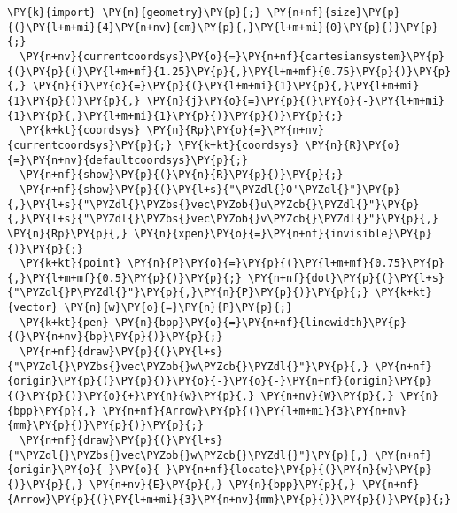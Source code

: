 \begin{Verbatim}[commandchars=\\\{\}]
  \PY{k}{import} \PY{n}{geometry}\PY{p}{;} \PY{n+nf}{size}\PY{p}{(}\PY{l+m+mi}{4}\PY{n+nv}{cm}\PY{p}{,}\PY{l+m+mi}{0}\PY{p}{)}\PY{p}{;}
  \PY{n+nv}{currentcoordsys}\PY{o}{=}\PY{n+nf}{cartesiansystem}\PY{p}{(}\PY{p}{(}\PY{l+m+mf}{1.25}\PY{p}{,}\PY{l+m+mf}{0.75}\PY{p}{)}\PY{p}{,} \PY{n}{i}\PY{o}{=}\PY{p}{(}\PY{l+m+mi}{1}\PY{p}{,}\PY{l+m+mi}{1}\PY{p}{)}\PY{p}{,} \PY{n}{j}\PY{o}{=}\PY{p}{(}\PY{o}{-}\PY{l+m+mi}{1}\PY{p}{,}\PY{l+m+mi}{1}\PY{p}{)}\PY{p}{)}\PY{p}{;}
  \PY{k+kt}{coordsys} \PY{n}{Rp}\PY{o}{=}\PY{n+nv}{currentcoordsys}\PY{p}{;} \PY{k+kt}{coordsys} \PY{n}{R}\PY{o}{=}\PY{n+nv}{defaultcoordsys}\PY{p}{;}
  \PY{n+nf}{show}\PY{p}{(}\PY{n}{R}\PY{p}{)}\PY{p}{;}
  \PY{n+nf}{show}\PY{p}{(}\PY{l+s}{"\PYZdl{}O'\PYZdl{}"}\PY{p}{,}\PY{l+s}{"\PYZdl{}\PYZbs{}vec\PYZob{}u\PYZcb{}\PYZdl{}"}\PY{p}{,}\PY{l+s}{"\PYZdl{}\PYZbs{}vec\PYZob{}v\PYZcb{}\PYZdl{}"}\PY{p}{,} \PY{n}{Rp}\PY{p}{,} \PY{n}{xpen}\PY{o}{=}\PY{n+nf}{invisible}\PY{p}{)}\PY{p}{;}
  \PY{k+kt}{point} \PY{n}{P}\PY{o}{=}\PY{p}{(}\PY{l+m+mf}{0.75}\PY{p}{,}\PY{l+m+mf}{0.5}\PY{p}{)}\PY{p}{;} \PY{n+nf}{dot}\PY{p}{(}\PY{l+s}{"\PYZdl{}P\PYZdl{}"}\PY{p}{,}\PY{n}{P}\PY{p}{)}\PY{p}{;} \PY{k+kt}{vector} \PY{n}{w}\PY{o}{=}\PY{n}{P}\PY{p}{;}
  \PY{k+kt}{pen} \PY{n}{bpp}\PY{o}{=}\PY{n+nf}{linewidth}\PY{p}{(}\PY{n+nv}{bp}\PY{p}{)}\PY{p}{;}
  \PY{n+nf}{draw}\PY{p}{(}\PY{l+s}{"\PYZdl{}\PYZbs{}vec\PYZob{}w\PYZcb{}\PYZdl{}"}\PY{p}{,} \PY{n+nf}{origin}\PY{p}{(}\PY{p}{)}\PY{o}{-}\PY{o}{-}\PY{n+nf}{origin}\PY{p}{(}\PY{p}{)}\PY{o}{+}\PY{n}{w}\PY{p}{,} \PY{n+nv}{W}\PY{p}{,} \PY{n}{bpp}\PY{p}{,} \PY{n+nf}{Arrow}\PY{p}{(}\PY{l+m+mi}{3}\PY{n+nv}{mm}\PY{p}{)}\PY{p}{)}\PY{p}{;}
  \PY{n+nf}{draw}\PY{p}{(}\PY{l+s}{"\PYZdl{}\PYZbs{}vec\PYZob{}w\PYZcb{}\PYZdl{}"}\PY{p}{,} \PY{n+nf}{origin}\PY{o}{-}\PY{o}{-}\PY{n+nf}{locate}\PY{p}{(}\PY{n}{w}\PY{p}{)}\PY{p}{,} \PY{n+nv}{E}\PY{p}{,} \PY{n}{bpp}\PY{p}{,} \PY{n+nf}{Arrow}\PY{p}{(}\PY{l+m+mi}{3}\PY{n+nv}{mm}\PY{p}{)}\PY{p}{)}\PY{p}{;}
\end{Verbatim}
